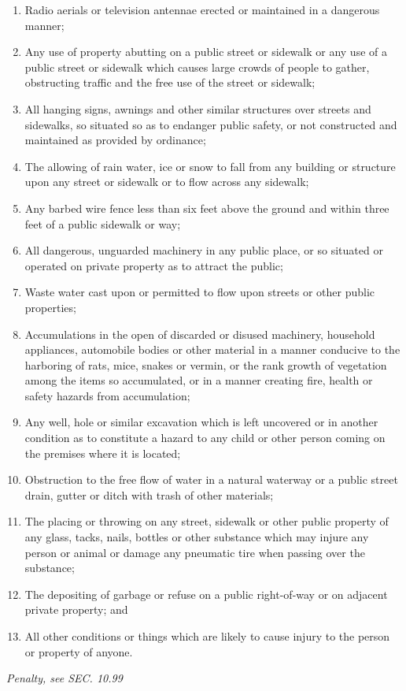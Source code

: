 \begin{enumerate}[{\indent}A)]
    \item Radio aerials or television antennae erected or maintained in a dangerous manner;
    \item Any use of property abutting on a public street or sidewalk or any use of a public street or sidewalk which causes large crowds of people to gather, obstructing traffic and the free use of the street or sidewalk;
    \item All hanging signs, awnings and other similar structures over streets and sidewalks, so situated so as to endanger public safety, or not constructed and maintained as provided by ordinance;
    \item The allowing of rain water, ice or snow to fall from any building or structure upon any street or sidewalk or to flow across any sidewalk;
    \item Any barbed wire fence less than six feet above the ground and within three feet of a public sidewalk or way;
    \item All dangerous, unguarded machinery in any public place, or so situated or operated on private property as to attract the public;
    \item Waste water cast upon or permitted to flow upon streets or other public properties;
    \item Accumulations in the open of discarded or disused machinery, household appliances, automobile bodies or other material in a manner conducive to the harboring of rats, mice, snakes or vermin, or the rank growth of vegetation among the items so accumulated, or in a manner creating fire, health or safety hazards from accumulation;
    \item Any well, hole or similar excavation which is left uncovered or in another condition as to constitute a hazard to any child or other person coming on the premises where it is located;
    \item Obstruction to the free flow of water in a natural waterway or a public street drain, gutter or ditch with trash of other materials;
    \item The placing or throwing on any street, sidewalk or other public property of any glass, tacks, nails, bottles or other substance which may injure any person or animal or damage any pneumatic tire when passing over the substance;
    \item The depositing of garbage or refuse on a public right-of-way or on adjacent private property; and
    \item All other conditions or things which are likely to cause injury to the person or property of anyone.
\end{enumerate}
\emph{Penalty, see SEC. 10.99}
